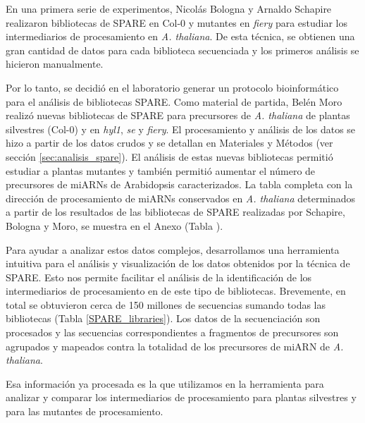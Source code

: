En una primera serie de experimentos, Nicolás Bologna y Arnaldo Schapire realizaron bibliotecas de SPARE en Col-0 y mutantes en \textit{fiery} para estudiar los intermediarios de procesamiento en \textit{A. thaliana}.
De esta técnica, se obtienen una gran cantidad de datos para cada biblioteca secuenciada y los primeros análisis se hicieron manualmente.

Por lo tanto, se decidió en el laboratorio generar un protocolo bioinformático para el análisis de bibliotecas SPARE. 
Como material de partida, Belén Moro realizó nuevas bibliotecas de SPARE para precursores de \textit{A. thaliana} de plantas silvestres (Col-0) y en \textit{hyl1}, \textit{se} y \textit{fiery}.
El procesamiento y análisis de los datos se hizo a partir de los datos crudos y se detallan en Materiales y Métodos (ver sección \ref{sec:analisis_spare}).
El análisis de estas nuevas bibliotecas permitió estudiar a plantas mutantes y también permitió aumentar el número de precursores de miARNs de Arabidopsis caracterizados.
La tabla completa con la dirección de procesamiento de miARNs conservados en \textit{A. thaliana} determinados a partir de los resultados de las bibliotecas de SPARE realizadas por Schapire, Bologna y  Moro, se muestra en el Anexo (Tabla \label{table:mecanismos}).

Para ayudar a analizar estos datos complejos, desarrollamos una herramienta intuitiva para el análisis y visualización de los datos obtenidos por la técnica de SPARE.
Esto nos permite facilitar el análisis de la identificación de los intermediarios de procesamiento en de este tipo de bibliotecas.
Brevemente, en total se obtuvieron cerca de 150 millones de secuencias sumando todas las bibliotecas (Tabla \ref{SPARE_libraries}).
Los datos de la secuenciación son procesados y las secuencias correspondientes a fragmentos de precursores son agrupados y mapeados contra la totalidad de los precursores de miARN de \textit{A. thaliana}.

Esa información ya procesada es la que utilizamos en la herramienta para analizar y comparar los intermediarios de procesamiento para plantas silvestres y para las mutantes de procesamiento.


